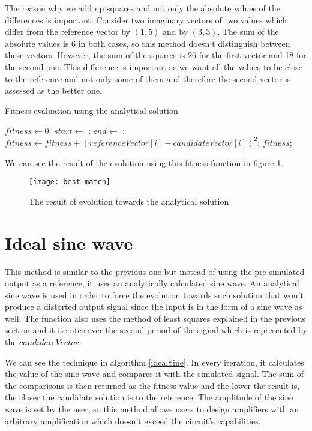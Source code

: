 The reason why we add up squares and not only the absolute values of the differences is important. Consider two imaginary vectors of two values which differ from the reference vector by $(1, 5)$ and by $(3,3)$. The sum of the absolute values is 6 in both cases, so this method doesn't distinguish between these vectors. However, the sum of the squares is 26 for the first vector and 18 for the second one. This difference is important as we want all the values to be close to the reference and not only some of them and therefore the second vector is assessed as the better one.

\begin{algorithm}
\caption{Fitness evaluation using the analytical solution}
\label{bestFit}
\begin{algorithmic}[1]
        \State $fitness \gets 0$;
        \State $start \gets$ ;
        \State $end \gets$ ;
            \State $fitness \gets fitness + (referenceVector[i] - candidateVector[i])^2$;
        \EndFor
        \State \Return $fitness$;
     \EndFunction
\end{algorithmic}
\end{algorithm}

We can see the result of the evolution using this fitness function in figure \ref{best-match}.

\begin{figure}[H]
    \centerline{\texttt{[image: best-match]}\label{best-match}}
    \caption{The result of evolution towards the analytical solution}
\end{figure}

\section{Ideal sine wave}
This method is similar to the previous one but instead of using the pre-simulated output as a reference, it uses an analytically calculated sine wave. An analytical sine wave is used in order to force the evolution towards such solution that won't produce a distorted output signal since the input is in the form of a sine wave as well. The function also uses the method of least squares explained in the previous section and it iterates over the second period of the signal which is represented by the $candidateVector$.

We can see the technique in algorithm \ref{idealSine}. In every iteration, it calculates the value of the sine wave and compares it with the simulated signal. The sum of the comparisons is then returned as the fitness value and the lower the result is, the closer the candidate solution is to the reference. The amplitude of the sine wave is set by the user, so this method allows users to design amplifiers with an arbitrary amplification which doesn't exceed the circuit's capabilities.

